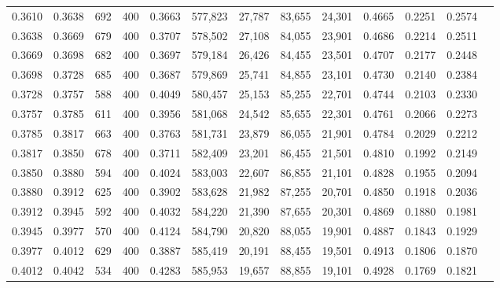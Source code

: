 \begin{tabular}{rrrrrrrrrrrrr}
0.3610 & 0.3638 &    692 & 400 &                                     0.3663 & 577,823 &  27,787 &  83,655 &  24,301 & 0.4665 & 0.2251 & 0.2574 \\
0.3638 & 0.3669 &    679 & 400 &                                     0.3707 & 578,502 &  27,108 &  84,055 &  23,901 & 0.4686 & 0.2214 & 0.2511 \\
0.3669 & 0.3698 &    682 & 400 &                                     0.3697 & 579,184 &  26,426 &  84,455 &  23,501 & 0.4707 & 0.2177 & 0.2448 \\
0.3698 & 0.3728 &    685 & 400 &                                     0.3687 & 579,869 &  25,741 &  84,855 &  23,101 & 0.4730 & 0.2140 & 0.2384 \\
0.3728 & 0.3757 &    588 & 400 &                                     0.4049 & 580,457 &  25,153 &  85,255 &  22,701 & 0.4744 & 0.2103 & 0.2330 \\
0.3757 & 0.3785 &    611 & 400 &                                     0.3956 & 581,068 &  24,542 &  85,655 &  22,301 & 0.4761 & 0.2066 & 0.2273 \\
0.3785 & 0.3817 &    663 & 400 &                                     0.3763 & 581,731 &  23,879 &  86,055 &  21,901 & 0.4784 & 0.2029 & 0.2212 \\
0.3817 & 0.3850 &    678 & 400 &                                     0.3711 & 582,409 &  23,201 &  86,455 &  21,501 & 0.4810 & 0.1992 & 0.2149 \\
0.3850 & 0.3880 &    594 & 400 &                                     0.4024 & 583,003 &  22,607 &  86,855 &  21,101 & 0.4828 & 0.1955 & 0.2094 \\
0.3880 & 0.3912 &    625 & 400 &                                     0.3902 & 583,628 &  21,982 &  87,255 &  20,701 & 0.4850 & 0.1918 & 0.2036 \\
0.3912 & 0.3945 &    592 & 400 &                                     0.4032 & 584,220 &  21,390 &  87,655 &  20,301 & 0.4869 & 0.1880 & 0.1981 \\
0.3945 & 0.3977 &    570 & 400 &                                     0.4124 & 584,790 &  20,820 &  88,055 &  19,901 & 0.4887 & 0.1843 & 0.1929 \\
0.3977 & 0.4012 &    629 & 400 &                                     0.3887 & 585,419 &  20,191 &  88,455 &  19,501 & 0.4913 & 0.1806 & 0.1870 \\
0.4012 & 0.4042 &    534 & 400 &                                     0.4283 & 585,953 &  19,657 &  88,855 &  19,101 & 0.4928 & 0.1769 & 0.1821 \\

\end{tabular}

